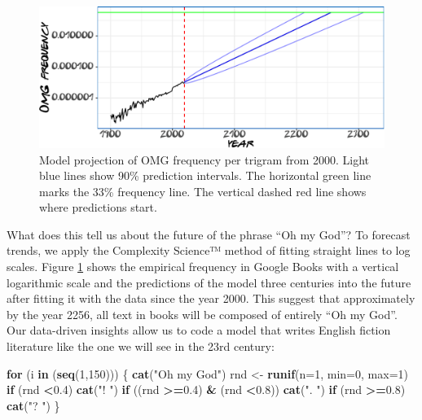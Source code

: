 \documentclass[]{article}
\newenvironment{Shaded}{\begin{snugshade}}{\end{snugshade}}
\newcommand{\ControlFlowTok}[1]{\textcolor[rgb]{0.13,0.29,0.53}{\textbf{#1}}}
\newcommand{\DataTypeTok}[1]{\textcolor[rgb]{0.13,0.29,0.53}{#1}}
\newcommand{\DecValTok}[1]{\textcolor[rgb]{0.00,0.00,0.81}{#1}}
\newcommand{\FloatTok}[1]{\textcolor[rgb]{0.00,0.00,0.81}{#1}}
\newcommand{\KeywordTok}[1]{\textcolor[rgb]{0.13,0.29,0.53}{\textbf{#1}}}
\newcommand{\NormalTok}[1]{#1}
\newcommand{\OperatorTok}[1]{\textcolor[rgb]{0.81,0.36,0.00}{\textbf{#1}}}
\newcommand{\StringTok}[1]{\textcolor[rgb]{0.31,0.60,0.02}{#1}}
\begin{document}
\begin{figure}

{\centering \includegraphics{Friends_HPS_pdf_files/figure-latex/booksmodel-1} 

}

\caption{Model projection of OMG frequency per trigram from 2000. Light blue lines show 90\% prediction intervals. The horizontal green line marks the 33\% frequency line. The vertical dashed red line shows where predictions start.}\label{fig:booksmodel}
\end{figure}


What does this tell us about the future of the phrase ``Oh my God''? To forecast trends, we apply the Complexity Science™ method of fitting straight lines to log scales. Figure \ref{fig:booksmodel} shows the empirical frequency in Google Books with a vertical logarithmic scale and the predictions of the model three centuries into the future after fitting it with the data since the year 2000. This suggest that approximately by the year 2256, all text in books will be composed of entirely ``Oh my God''. Our data-driven insights allow us to code a model that writes English fiction literature like the one we will see in the 23rd century:

\begin{Shaded}
\begin{Highlighting}[]
\ControlFlowTok{for}\NormalTok{ (i }\ControlFlowTok{in}\NormalTok{ (}\KeywordTok{seq}\NormalTok{(}\DecValTok{1}\NormalTok{,}\DecValTok{150}\NormalTok{)))}
\NormalTok{\{}
  \KeywordTok{cat}\NormalTok{(}\StringTok{"Oh my God"}\NormalTok{)}
\NormalTok{  rnd <-}\StringTok{ }\KeywordTok{runif}\NormalTok{(}\DataTypeTok{n=}\DecValTok{1}\NormalTok{, }\DataTypeTok{min=}\DecValTok{0}\NormalTok{, }\DataTypeTok{max=}\DecValTok{1}\NormalTok{)}
  \ControlFlowTok{if}\NormalTok{ (rnd }\OperatorTok{<}\FloatTok{0.4}\NormalTok{)}
    \KeywordTok{cat}\NormalTok{(}\StringTok{"! "}\NormalTok{)}
  \ControlFlowTok{if}\NormalTok{ ((rnd }\OperatorTok{>=}\FloatTok{0.4}\NormalTok{) }\OperatorTok{&}\StringTok{ }\NormalTok{(rnd }\OperatorTok{<}\FloatTok{0.8}\NormalTok{))}
    \KeywordTok{cat}\NormalTok{(}\StringTok{". "}\NormalTok{)}
  \ControlFlowTok{if}\NormalTok{ (rnd }\OperatorTok{>=}\FloatTok{0.8}\NormalTok{)}
    \KeywordTok{cat}\NormalTok{(}\StringTok{"? "}\NormalTok{)}
\NormalTok{  \}}
\end{Highlighting}
\end{Shaded}
\end{document}
